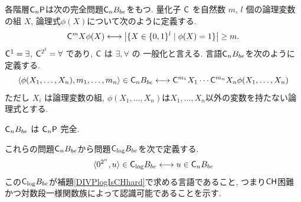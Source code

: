 各階層$\mathsf{C}_n \mathsf{P}$は次の完全問題$\mathsf{C}_n B_{be}$をもつ.
量化子 $\mathsf{C}$ を自然数 $m$, $l$ 個の論理変数の組 $X$,
論理式$\phi(X)$について次のように定義する.
\begin{equation}
 \mathsf{C}^m X \phi(X) 
  \longleftrightarrow 
  \bigl|\{X \in \{0, 1\}^l \mid \phi(X) = 1\}\bigr| \ge m.
\end{equation}
$\mathsf{C}^1 = \exists$, $\mathsf{C}^{2^l} = \forall$ であり, $\mathsf{C}$ は $\exists, \forall$ の
一般化と言える.
言語$\mathsf{C}_n B_{be}$を次のように定義する.
\begin{equation}
 \langle \phi(X_1, \dots, X_n), m_1, \dots, m_n \rangle \in \mathsf{C}_n B_{be}
 \longleftrightarrow
 \mathsf{C}^{m_1}{X_1} \cdots \mathsf{C}^{m_n}{X_n} \phi(X_1, \dots, X_n) 
\end{equation}
ただし
$X_i$ は論理変数の組,
$\phi(X_1, \dots, X_n)$は$X_1, \dots, X_n$以外の変数を持たない論理式とする.

\begin{lemma} \label{lemma:CnP-complete}
 $\mathsf{C}_n B_{be}$ は $\mathsf{C}_n\mathsf{P}$ 完全.
\end{lemma}

これらの問題$\mathsf{C}_n B_{be}$から問題$\mathsf{C}_{\log} B_{be}$を次で定義する.
\begin{equation}
 \langle 0^{2^n}, u \rangle \in \mathsf{C}_{\log} B_{be}
 \longleftrightarrow
 u \in \mathsf{C}_n B_{be}
\end{equation}
この$\mathsf{C}_{\log} B_{be}$が補題\ref{DIVPlogIsCHhard}で求める言語であること,
つまり$\mathsf{CH}$困難かつ対数段一様関数族によって認識可能であることを示す.

